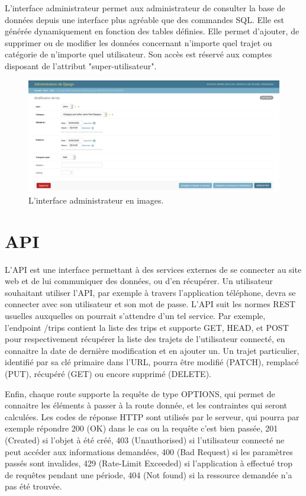 L'interface administrateur permet aux administrateur de consulter la base de données depuis une interface plus agréable que des commandes SQL. Elle est générée dynamiquement en fonction des tables définies. Elle permet d'ajouter, de supprimer ou de modifier les données concernant n'importe quel trajet ou catégorie de n'importe quel utilisateur. Son accès est réservé aux comptes disposant de l'attribut "super-utilisateur".

\begin{figure}[H]
    \centering
    \includegraphics[keepaspectratio, width=2\textwidth/2, height=2\textheight/5]{ima/interface-admin}
    \caption{L'interface administrateur en images.}
    \label{fig:80-interface-administrateur}
\end{figure}


\section{API}

L'\gls{API} est une interface permettant à des services externes de se connecter au site web et de lui communiquer des données, ou d'en récupérer. Un utilisateur souhaitant utiliser l'\gls{API}, par exemple à travers l'application téléphone, devra se connecter avec son utilisateur et son mot de passe.
L'\gls{API} suit les normes \gls{REST} usuelles auxquelles on pourrait s'attendre d'un tel service. Par exemple, l'endpoint /trips contient la liste des trips et supporte GET, HEAD, et POST pour respectivement récupérer la liste des trajets de l'utilisateur connecté, en connaitre la date de dernière modification et en ajouter un.
Un trajet particulier, identifié par sa clé primaire dans l'URL, pourra être modifié (PATCH), remplacé (PUT), récupéré (GET) ou encore supprimé (DELETE).

Enfin, chaque route supporte la requête de type OPTIONS, qui permet de connaitre les éléments à passer à la route donnée, et les contraintes qui seront calculées.
Les codes de réponse HTTP sont utilisés par le serveur, qui pourra par exemple répondre 200 (OK) dans le cas ou la requête c'est bien passée, 201 (Created) si l'objet à été créé, 403 (Unauthorised) si l'utilisateur connecté ne peut accéder aux informations demandées, 400 (Bad Request) si les paramètres passés sont invalides, 429 (Rate-Limit Exceeded) si l'application à effectué trop de requêtes pendant une période, 404 (Not found) si la ressource demandée n'a pas été trouvée.

